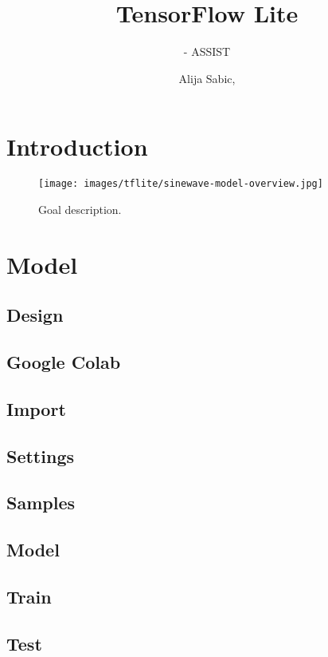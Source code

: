 \documentclass[aspectratio=169]{beamer}
\title[TensorFlow Lite]{TensorFlow Lite}
\subtitle{\glsentrytext{ci} - ASSIST \glsentrytext{heidi}}
\author{Alija Sabic, \glsentrytext{msc}}
\institute{Department Electronic Engineering}
\begin{document}
\begin{frame}[plain]
    \titlepage
\end{frame}

\section{Introduction}

\begin{frame}
    \begin{figure}
        \texttt{[image: images/tflite/sinewave-model-overview.jpg]}
        \caption{Goal description.}
    \end{figure}
\end{frame}

\section{Model}
\subsection{Design}

\subsection{Google Colab}

\subsection{Import}

\subsection{Settings}

\subsection{Samples}

\subsection{Model}

\subsection{Train}

\subsection{Test}

\end{document}
